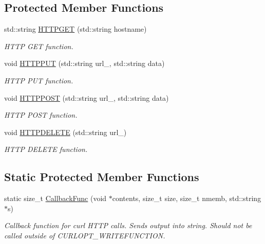 \subsection*{Protected Member Functions}
\begin{DoxyCompactItemize}
\item 
std\+::string \hyperlink{class_couch_d_b_a461de7a03b4bd193d3aed9091ce3d4f4}{H\+T\+T\+P\+G\+ET} (std\+::string hostname)
\begin{DoxyCompactList}\small\item\em H\+T\+TP G\+ET function. \end{DoxyCompactList}\item 
void \hyperlink{class_couch_d_b_ad91ed8572390817ab76f0eb8b775cc1e}{H\+T\+T\+P\+P\+UT} (std\+::string url\+\_\+, std\+::string data)
\begin{DoxyCompactList}\small\item\em H\+T\+TP P\+UT function. \end{DoxyCompactList}\item 
void \hyperlink{class_couch_d_b_a1706c29bced912993c3bf969d03362f6}{H\+T\+T\+P\+P\+O\+ST} (std\+::string url\+\_\+, std\+::string data)
\begin{DoxyCompactList}\small\item\em H\+T\+TP P\+O\+ST function. \end{DoxyCompactList}\item 
void \hyperlink{class_couch_d_b_af1b891b40a933acf4895d026abb48800}{H\+T\+T\+P\+D\+E\+L\+E\+TE} (std\+::string url\+\_\+)
\begin{DoxyCompactList}\small\item\em H\+T\+TP D\+E\+L\+E\+TE function. \end{DoxyCompactList}\end{DoxyCompactItemize}
\subsection*{Static Protected Member Functions}
\begin{DoxyCompactItemize}
\item 
static size\+\_\+t \hyperlink{class_couch_d_b_a6216c074f7062f4098e7ab3e848a6c3d}{Callback\+Func} (void $\ast$contents, size\+\_\+t size, size\+\_\+t nmemb, std\+::string $\ast$s)
\begin{DoxyCompactList}\small\item\em Callback function for curl H\+T\+TP calls. Sends output into string. Should not be called outside of C\+U\+R\+L\+O\+P\+T\+\_\+\+W\+R\+I\+T\+E\+F\+U\+N\+C\+T\+I\+ON. \end{DoxyCompactList}\end{DoxyCompactItemize}
